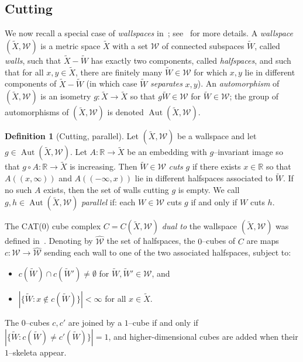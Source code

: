 \documentclass[11pt,oneside]{amsart}
\theoremstyle{definition}
\newtheorem{defn}[thm]{Definition}
\DeclareMathOperator{\Aut}{Aut}
\newcommand{\field}[1]{\mathbb{#1}}
\newcommand{\reals}{\ensuremath{\field{R}}}
\begin{document}
\subsection{Cutting}\label{subsec:cut_wall}
We now recall a special case of \emph{wallspaces}  in~\cite{HaglundPaulin:wallspace}; see~\cite{HruskaWise:finiteness} for more details. A \emph{wallspace} $(\widetilde X,\mathcal W)$ is a metric space $\widetilde X$ with a set $\mathcal W$ of connected subspaces $\widetilde W$, called \emph{walls}, such that $\widetilde X-\widetilde W$ has exactly two components, called \emph{halfspaces}, and such that for all $x,y\in\widetilde X$, there are finitely many $\widetilde W\in\mathcal W$ for which $x,y$ lie in different components of $\widetilde X-\widetilde W$ (in which case $\widetilde W$ \emph{separates} $x,y$).  An \emph{automorphism} of $(\widetilde X,\mathcal W)$ is an isometry $g:\widetilde X\to\widetilde X$ so that $g\widetilde W\in\mathcal W$ for $\widetilde W\in\mathcal W$; the group of automorphisms of $(\widetilde X,\mathcal W)$ is denoted $\Aut(\widetilde X,\mathcal W)$.

\begin{defn}[Cutting, parallel]\label{defn:cutting}
Let $(\widetilde X,\mathcal W)$ be a wallspace and let $g\in\Aut(\widetilde X,\mathcal W)$.  Let $A:\reals\to\widetilde X$ be an embedding with $g$--invariant image so that $g\circ A:\reals\to\widetilde X$ is increasing.  Then $\widetilde W\in\mathcal W$ \emph{cuts} $g$ if there exists $x\in\reals$ so that $A((x,\infty))$ and $A((-\infty,x))$ lie in different halfspaces associated to $\widetilde W$. If no such $A$ exists, then the set of walls cutting $g$ is empty. We call $g,h\in\Aut(\widetilde X,\mathcal W)$ \emph{parallel} if: each $W\in\mathcal W$ cuts $g$ if and only if $W$ cuts $h$.
\end{defn}

The CAT(0) cube complex $C=C(\widetilde X,\mathcal W)$ \emph{dual to} the wallspace $(\widetilde X,\mathcal W)$ was defined in~\cite{Sageev:cubes}.  Denoting by $\widehat{\mathcal W}$ the set of halfspaces, the $0$--cubes of $C$ are maps $c:\mathcal W\to\widehat{\mathcal W}$ sending each wall to one of the two associated halfspaces, subject to: 
\begin{itemize}
    \item $c(\widetilde W)\cap c(\widetilde W')\neq\emptyset$ for $\widetilde W,\widetilde W'\in\mathcal W$, and
    \item $|\{\widetilde W:x\not\in c(\widetilde W)\}|<\infty$  for all $x\in\widetilde X$.
\end{itemize}
The $0$--cubes $c,c'$ are joined by a $1$--cube if and only if $|\{\widetilde 
 W:c(\widetilde W)\neq c'(\widetilde W)\}|=1$, and higher-dimensional cubes are added when their $1$--skeleta appear.
\end{document}
